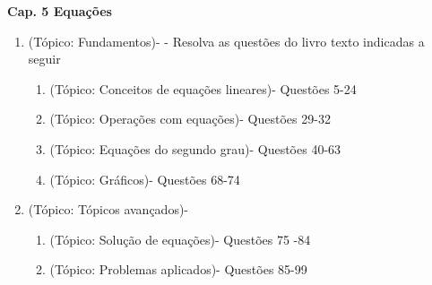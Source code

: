 \documentclass[12pt,onepage,a4paper]{memoir}
\newcommand{\tit}{Cap. 5 Equações}
\newcommand{\tp}[1]{(Tópico: #1)- }
\begin{document}
\thispagestyle{1pagina}
\vspace*{2.5cm} %

\vspace{0.5cm}
\textbf{\textsf{\large \tit}} %



\begin{enumerate} %
\item \tp{Fundamentos} - Resolva as questões do livro texto indicadas a seguir 
  \begin{enumerate}
\item \tp{Conceitos de equações lineares}  Questões 5-24
\item \tp{Operações com equações} Questões 29-32
\item \tp{Equações do segundo grau} Questões 40-63
\item \tp{Gráficos} Questões 68-74
\end{enumerate}

\item \tp{Tópicos avançados}
  \begin{enumerate}
  \item \tp{Solução de equações} Questões 75 -84
  \item \tp{Problemas aplicados} Questões 85-99
\end{enumerate}
  
\end{enumerate} %
\end{document}
